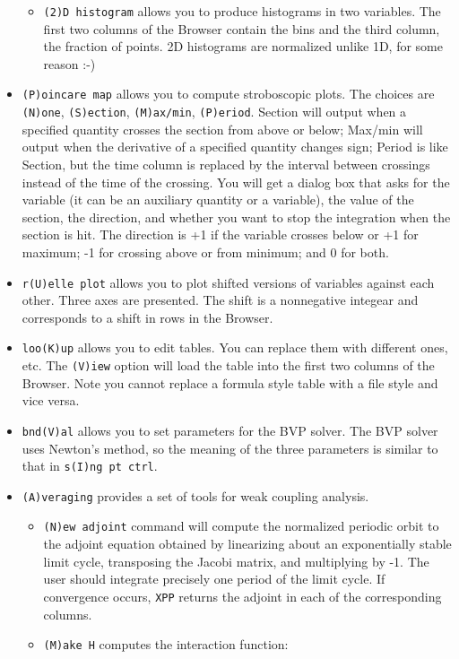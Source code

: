 \documentclass{article}
\begin{document}
\begin{itemize}
\begin{itemize}
\item {\tt (2)D histogram} allows you to produce histograms in two variables. The first two columns of the Browser contain the bins and the third column, the fraction of points. 2D histograms are normalized unlike 1D, for some reason :-)
\end{itemize}
\item {\tt (P)oincare map} allows you to compute stroboscopic plots. The choices are {\tt (N)one}, {\tt (S)ection}, {\tt (M)ax/min}, {\tt (P)eriod}.  Section will output when a specified quantity crosses the section from above or below; Max/min will output when the derivative of a specified quantity changes sign; Period is like Section, but the time column is replaced by the interval between crossings instead of the time of the crossing. You will get a dialog box that asks for the variable (it can be an auxiliary quantity or a variable), the value of the section, the direction, and whether you want to stop the integration when the section is hit. The direction is +1 if the variable crosses below or +1 for maximum; -1 for crossing above or from minimum; and 0 for both. 
\item{\tt r(U)elle plot} allows you to plot shifted versions of variables against each other. Three axes are presented. The shift is a nonnegative integear and corresponds to a shift in rows in the Browser.
\item{\tt loo(K)up} allows you to edit tables. You can replace them with different ones, etc. The {\tt (V)iew} option will load the table into the first two columns of the Browser. Note you cannot replace a formula style table with a file style and vice versa.
\item{\tt bnd(V)al} allows you to set parameters for the BVP solver. The BVP solver uses Newton's method, so the meaning of the three parameters is similar to that in {\tt s(I)ng pt ctrl}. 
\item{\tt (A)veraging} provides a set of tools for weak coupling analysis. 
\begin{itemize}
\item {\tt (N)ew adjoint} command will compute the normalized periodic orbit to the adjoint equation obtained by linearizing about an exponentially stable limit cycle, transposing the Jacobi matrix, and multiplying by -1. The user should integrate precisely one period of the limit cycle. If convergence occurs, {\tt XPP} returns the adjoint in each of the corresponding columns. 
\item {\tt (M)ake H} computes the interaction function:

\end{itemize}
\end{itemize}
\end{document}
